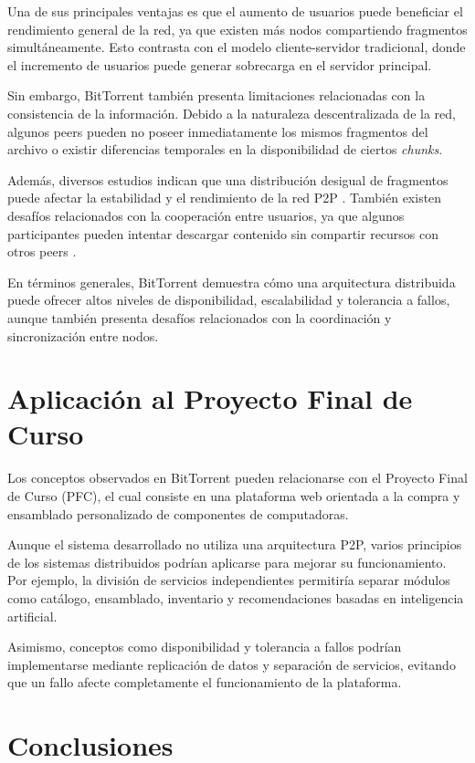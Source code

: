 \documentclass[12pt]{article}
\begin{document}
Una de sus principales ventajas es que el aumento de usuarios puede beneficiar el rendimiento general de la red, ya que existen más nodos compartiendo fragmentos simultáneamente. Esto contrasta con el modelo cliente-servidor tradicional, donde el incremento de usuarios puede generar sobrecarga en el servidor principal.

Sin embargo, BitTorrent también presenta limitaciones relacionadas con la consistencia de la información. Debido a la naturaleza descentralizada de la red, algunos peers pueden no poseer inmediatamente los mismos fragmentos del archivo o existir diferencias temporales en la disponibilidad de ciertos \textit{chunks}.

Además, diversos estudios indican que una distribución desigual de fragmentos puede afectar la estabilidad y el rendimiento de la red P2P \cite{ref4}. También existen desafíos relacionados con la cooperación entre usuarios, ya que algunos participantes pueden intentar descargar contenido sin compartir recursos con otros peers \cite{ref5}.

En términos generales, BitTorrent demuestra cómo una arquitectura distribuida puede ofrecer altos niveles de disponibilidad, escalabilidad y tolerancia a fallos, aunque también presenta desafíos relacionados con la coordinación y sincronización entre nodos.

\section{Aplicación al Proyecto Final de Curso}

Los conceptos observados en BitTorrent pueden relacionarse con el Proyecto Final de Curso (PFC), el cual consiste en una plataforma web orientada a la compra y ensamblado personalizado de componentes de computadoras.

Aunque el sistema desarrollado no utiliza una arquitectura P2P, varios principios de los sistemas distribuidos podrían aplicarse para mejorar su funcionamiento. Por ejemplo, la división de servicios independientes permitiría separar módulos como catálogo, ensamblado, inventario y recomendaciones basadas en inteligencia artificial.

Asimismo, conceptos como disponibilidad y tolerancia a fallos podrían implementarse mediante replicación de datos y separación de servicios, evitando que un fallo afecte completamente el funcionamiento de la plataforma.

\section{Conclusiones}
\end{document}
